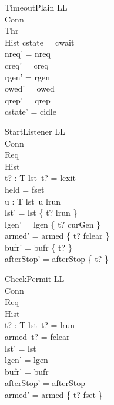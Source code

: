 \documentclass[a4paper,10pt,fleqn]{article}
\begin{document}
\begin{schema}{TimeoutPlain}
  \Delta LL \\
  \Xi Conn \\
  \Xi Thr \\
  \Xi Hist
\where
  cstate = cwait \\
  nreq' = nreq \\
  creq' = creq \\
  rgen' = rgen \\
  owed' = owed \\
  qrep' = qrep \\
  cstate' = cidle
\end{schema}

\begin{schema}{StartListener}
  \Delta LL \\
  \Xi Conn \\
  \Xi Req \\
  \Xi Hist \\
  t? : T
\where
  lst~t? = lexit \\
  held = fset \\
  \forall u : T \spot lst~u \neq lrun \\
  lst' = lst \oplus \{ t? \mapsto lrun \} \\
  lgen' = lgen \oplus \{ t? \mapsto curGen \} \\
  armed' = armed \oplus \{ t? \mapsto fclear \} \\
  bufr' = bufr \oplus \{ t? \mapsto \emptyset \} \\
  afterStop' = afterStop \oplus \{ t?  \}
\end{schema}

\begin{schema}{CheckPermit}
  \Delta LL \\
  \Xi Conn \\
  \Xi Req \\
  \Xi Hist \\
  t? : T
\where
  lst~t? = lrun \\
  armed~t? = fclear \\
  lst' = lst \\
  lgen' = lgen \\
  bufr' = bufr \\
  afterStop' = afterStop \\
  armed' = armed \oplus \{ t? \mapsto fset \}
\end{schema}
\end{document}
